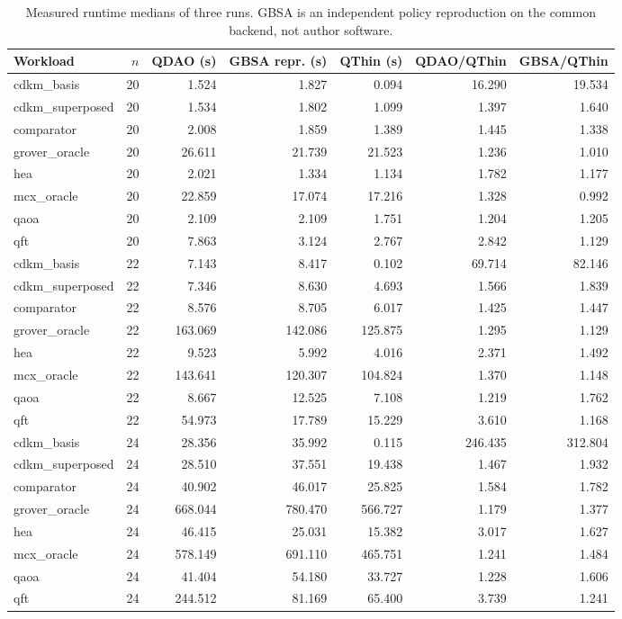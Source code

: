 \begin{table}[t]
\centering
\small
\caption{Measured runtime medians of three runs. GBSA is an independent policy reproduction on the common backend, not author software.}
\label{tab:three-way-runtime}
\begin{tabular}{lrrrrrr}
\hline
Workload & $n$ & QDAO (s) & GBSA repr. (s) & QThin (s) & QDAO/QThin & GBSA/QThin \\
\hline
cdkm\_basis & 20 & 1.524 & 1.827 & 0.094 & 16.290 & 19.534 \\
cdkm\_superposed & 20 & 1.534 & 1.802 & 1.099 & 1.397 & 1.640 \\
comparator & 20 & 2.008 & 1.859 & 1.389 & 1.445 & 1.338 \\
grover\_oracle & 20 & 26.611 & 21.739 & 21.523 & 1.236 & 1.010 \\
hea & 20 & 2.021 & 1.334 & 1.134 & 1.782 & 1.177 \\
mcx\_oracle & 20 & 22.859 & 17.074 & 17.216 & 1.328 & 0.992 \\
qaoa & 20 & 2.109 & 2.109 & 1.751 & 1.204 & 1.205 \\
qft & 20 & 7.863 & 3.124 & 2.767 & 2.842 & 1.129 \\
cdkm\_basis & 22 & 7.143 & 8.417 & 0.102 & 69.714 & 82.146 \\
cdkm\_superposed & 22 & 7.346 & 8.630 & 4.693 & 1.566 & 1.839 \\
comparator & 22 & 8.576 & 8.705 & 6.017 & 1.425 & 1.447 \\
grover\_oracle & 22 & 163.069 & 142.086 & 125.875 & 1.295 & 1.129 \\
hea & 22 & 9.523 & 5.992 & 4.016 & 2.371 & 1.492 \\
mcx\_oracle & 22 & 143.641 & 120.307 & 104.824 & 1.370 & 1.148 \\
qaoa & 22 & 8.667 & 12.525 & 7.108 & 1.219 & 1.762 \\
qft & 22 & 54.973 & 17.789 & 15.229 & 3.610 & 1.168 \\
cdkm\_basis & 24 & 28.356 & 35.992 & 0.115 & 246.435 & 312.804 \\
cdkm\_superposed & 24 & 28.510 & 37.551 & 19.438 & 1.467 & 1.932 \\
comparator & 24 & 40.902 & 46.017 & 25.825 & 1.584 & 1.782 \\
grover\_oracle & 24 & 668.044 & 780.470 & 566.727 & 1.179 & 1.377 \\
hea & 24 & 46.415 & 25.031 & 15.382 & 3.017 & 1.627 \\
mcx\_oracle & 24 & 578.149 & 691.110 & 465.751 & 1.241 & 1.484 \\
qaoa & 24 & 41.404 & 54.180 & 33.727 & 1.228 & 1.606 \\
qft & 24 & 244.512 & 81.169 & 65.400 & 3.739 & 1.241 \\
\hline
\end{tabular}
\end{table}

